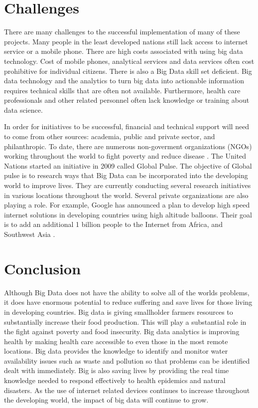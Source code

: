 \documentclass[sigconf]{acmart}
\begin{document}
\section{Challenges}
There are many challenges to the successful implementation of many of these projects.  Many people in the least developed nations still lack access to internet service or a mobile phone. There are high costs associated with using big data technology. Cost of mobile phones, analytical services and data services often cost prohibitive for individual citizens. There is also a Big Data skill set deficient. Big data technology and the analytics to turn big data into actionable information requires technical skills that are often not available. Furthermore, health care professionals and other related personnel often lack knowledge or training about data science. 

In order for initiatives to be successful, financial and technical support will need to come from other sources: academia, public and private sector, and philanthropic. To date, there are numerous non-goverment organizations (NGOs) working throughout the world to fight poverty and reduce disease \cite{www-google-Dataflo}. The United Nations started an initiative in 2009 called Global Pulse. The objective of Global pulse is to research ways that Big Data can be incorporated into the developing world to improve lives. They are currently conducting several research initiatives in various locations throughout the world. Several private organizations are also playing a role. For example, Google has announced a plan to develop high speed internet solutions in developing countries using high altitude balloons. Their goal is to add an additional 1 billion people to the Internet from Africa, and Southwest Asia \cite{DevEcon}. 

\section{Conclusion}

Although Big Data does not have the ability to solve all of the worlds problems, it does have enormous potential to reduce suffering and save lives for those living in developing countries. Big data is giving smallholder farmers resources to substantially increase their food production. This will play a substantial role in the fight against poverty and food insecurity. Big data analytics is improving health by making health care accessible to even those in the most remote locations. Big data provides the knowledge to identify and monitor water availability issues such as waste and pollution so that problems can be identified dealt with immediately. Big is also saving lives by providing the real time knowledge needed to respond effectively to health epidemics and natural disasters. As the use of internet related devices continues to increase throughout the developing world, the impact of big data will continue to grow.   
\end{document}
